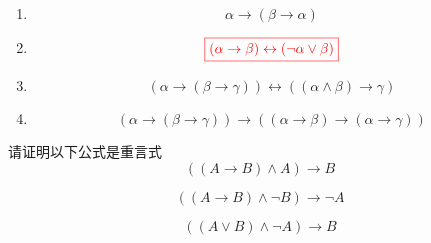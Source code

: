 \begin{frame}{}
  \begin{enumerate}[(1)]
    \item
      \[
        \alpha \to (\beta \to \alpha)
      \]
    \item
      \[
        \textcolor{red}{\boxed{(\alpha \to \beta) \leftrightarrow (\lnot \alpha \lor \beta)}}
      \]
    \item
      \[
        (\alpha \to (\beta \to \gamma)) \leftrightarrow ((\alpha \land \beta) \to \gamma)
      \]
    \item
      \[
        (\alpha \to (\beta \to \gamma)) \to ((\alpha \to \beta) \to (\alpha \to \gamma))
      \]
  \end{enumerate}
\end{frame}

\begin{frame}{}
  \begin{exampleblock}{请证明以下公式是重言式}
    \[
      ((A \to B) \land A) \to B
    \]

    \pause
    \vspace{0.50cm}
    \[
      ((A \to B) \land \lnot B) \to \lnot A
    \]

    \pause
    \vspace{0.50cm}
    \[
      ((A \lor B) \land \lnot A) \to B
    \]
  \end{exampleblock}
\end{frame}

